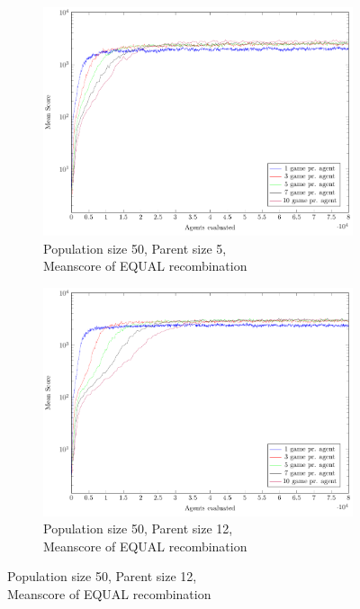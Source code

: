 \begin{figure}
    \centering
    \begin{subfigure}[b]{0.45\textwidth}
    	\centering
        \caption{Population size 50, Parent size 5, \\Meanscore of EQUAL recombination}
        \includegraphics[width=\textwidth]{data/cma_population_offspring/50x_split/equal_l50_o5/mean/PlotFile.pdf}
    \end{subfigure} 
    \begin{subfigure}[b]{0.45\textwidth}
    	\centering
    	\caption{Population size 50, Parent size 12, \\ Meanscore of EQUAL recombination}
        \includegraphics[width=\textwidth]{data/cma_population_offspring/50x_split/equal_l50_o12/mean/PlotFile.pdf}

\end{subfigure}
\end{figure}
